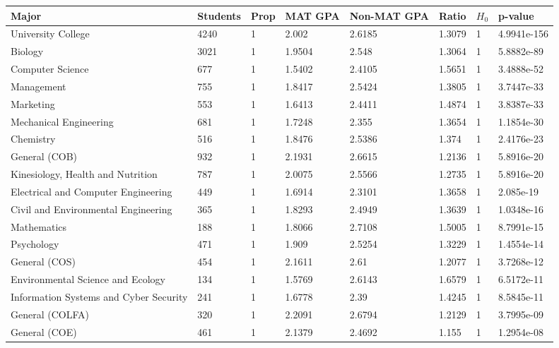 \begin{sidewaystable} 
	{\scriptsize \ttfamily \begin{longtable}{llllllll}\label{table:MAT}
	 \centering 
	 \textbf{Major} & \textbf{Students} & \textbf{Prop} & \textbf{MAT GPA} & \textbf{Non-MAT GPA} & \textbf{Ratio} & \textbf{$H_0$} & \textbf{p-value} \\ 
	\hline 
	University College & 4240 & 1 & 2.002 & 2.6185 & 1.3079 & 1 & \color{red}4.9941e-156 \\ 
	Biology & 3021 & 1 & 1.9504 & 2.548 & 1.3064 & 1 & \color{red}5.8882e-89 \\ 
	Computer Science & 677 & 1 & 1.5402 & 2.4105 & 1.5651 & 1 & \color{red}3.4888e-52 \\ 
	Management & 755 & 1 & 1.8417 & 2.5424 & 1.3805 & 1 & \color{red}3.7447e-33 \\ 
	Marketing & 553 & 1 & 1.6413 & 2.4411 & 1.4874 & 1 & \color{red}3.8387e-33 \\ 
	Mechanical Engineering & 681 & 1 & 1.7248 & 2.355 & 1.3654 & 1 & \color{red}1.1854e-30 \\ 
	Chemistry & 516 & 1 & 1.8476 & 2.5386 & 1.374 & 1 & \color{red}2.4176e-23 \\ 
	General (COB) & 932 & 1 & 2.1931 & 2.6615 & 1.2136 & 1 & \color{red}5.8916e-20 \\ 
	Kinesiology, Health and Nutrition & 787 & 1 & 2.0075 & 2.5566 & 1.2735 & 1 & \color{red}5.8916e-20 \\ 
	Electrical and Computer Engineering & 449 & 1 & 1.6914 & 2.3101 & 1.3658 & 1 & \color{red}2.085e-19 \\ 
	Civil and Environmental Engineering & 365 & 1 & 1.8293 & 2.4949 & 1.3639 & 1 & \color{red}1.0348e-16 \\ 
	Mathematics & 188 & 1 & 1.8066 & 2.7108 & 1.5005 & 1 & \color{red}8.7991e-15 \\ 
	Psychology & 471 & 1 & 1.909 & 2.5254 & 1.3229 & 1 & \color{red}1.4554e-14 \\ 
	General (COS) & 454 & 1 & 2.1611 & 2.61 & 1.2077 & 1 & \color{red}3.7268e-12 \\ 
	Environmental Science and Ecology & 134 & 1 & 1.5769 & 2.6143 & 1.6579 & 1 & \color{red}6.5172e-11 \\ 
	Information Systems and Cyber Security & 241 & 1 & 1.6778 & 2.39 & 1.4245 & 1 & \color{red}8.5845e-11 \\ 
	General (COLFA) & 320 & 1 & 2.2091 & 2.6794 & 1.2129 & 1 & \color{red}3.7995e-09 \\ 
	General (COE) & 461 & 1 & 2.1379 & 2.4692 & 1.155 & 1 & \color{red}1.2954e-08 \\ 

\end{longtable}}
\end{sidewaystable}
